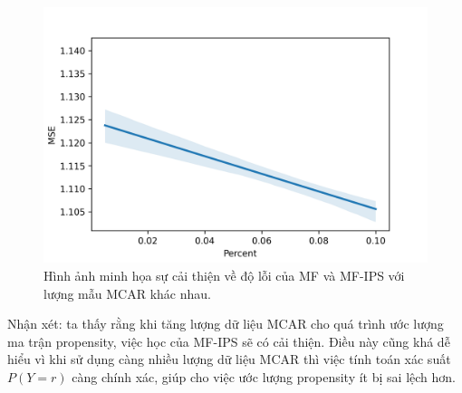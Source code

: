 \begin{figure}[h]
    \centering
    \includegraphics[width = \textwidth]{images/Chapter4/plot_percent1.png}
    \caption{Hình ảnh minh họa sự cải thiện về độ lỗi của MF và MF-IPS với lượng mẫu MCAR khác nhau.}
    \label{fig:4_percent}
\end{figure}

Nhận xét: ta thấy rằng khi tăng lượng dữ liệu MCAR cho quá trình ước lượng ma trận propensity, việc học của MF-IPS sẽ có cải thiện. Điều này cũng khá dễ hiểu vì khi sử dụng càng nhiều lượng dữ liệu MCAR thì việc tính toán xác suất $P(Y=r)$ càng chính xác, giúp cho việc ước lượng propensity ít bị sai lệch hơn.




